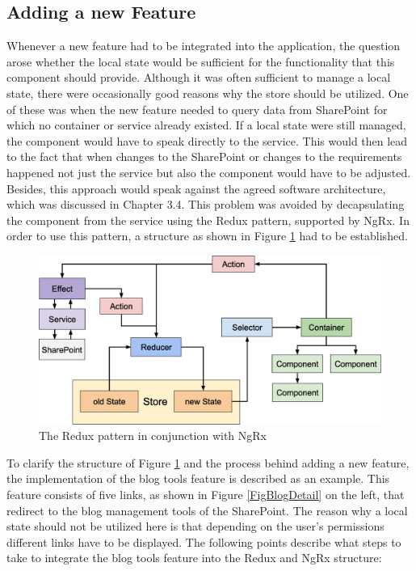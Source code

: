 \documentclass[Bachelor,BIF,english]{twbook}
\begin{document}
\subsection{Adding a new Feature}
Whenever a new feature had to be integrated into the application, the question arose whether the local state would be sufficient for the functionality that this component should provide. Although it was often sufficient to manage a local state, there were occasionally good reasons why the store should be utilized. One of these was when the new feature needed to query data from SharePoint for which no container or service already existed. If a local state were still managed, the component would have to speak directly to the service. This would then lead to the fact that when changes to the SharePoint or changes to the requirements happened not just the service but also the component would have to be adjusted. Besides, this approach would speak against the agreed software architecture, which was discussed in Chapter 3.4. This problem was avoided by decapsulating the component from the service using the Redux pattern, supported by NgRx. In order to use this pattern, a structure as shown in Figure \ref{Fig6} had to be established.
\\[\baselineskip]
\begin{figure}[!htbp]
\centering
\includegraphics[width=0.75\linewidth]{PICs/ngrx_redux_structure.eps}
\caption{The Redux pattern in conjunction with NgRx}\label{Fig6}
\end{figure}
To clarify the structure of Figure \ref{Fig6} and the process behind adding a new feature, the implementation of the blog tools feature is described as an example. This feature consists of five links, as shown in Figure \ref{FigBlogDetail} on the left, that redirect to the blog management tools of the SharePoint. The reason why a local state should not be utilized here is that depending on the user's permissions different links have to be displayed. The following points describe what steps to take to integrate the blog tools feature into the Redux and NgRx structure:
\end{document}
